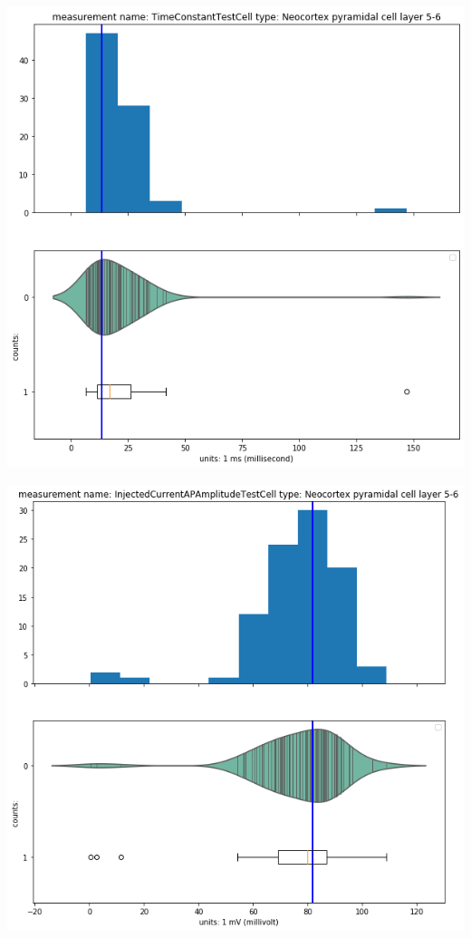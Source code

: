     \begin{center}
    \includegraphics[width=0.7\linewidth]{notebooks_converted/needata_thesis_files/needata_thesis_5_15}
    \end{center}

    \begin{center}
    \includegraphics[width=0.7\linewidth]{notebooks_converted/needata_thesis_files/needata_thesis_5_16}
    \end{center}
    { \hspace*{\fill} \\}
    
